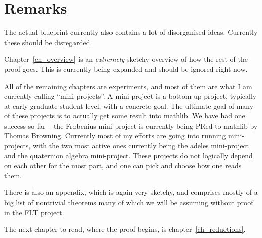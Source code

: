 \section{Remarks}

The actual blueprint currently also contains a lot of disorganised ideas. Currently these
should be disregarded.

Chapter~\ref{ch_overview} is an \emph{extremely} sketchy overview of how
the rest of the proof goes. This is currently being expanded and should be ignored
right now.

All of the remaining chapters are experiments, and most of them are what I am currently
calling ``mini-projects''. A mini-project is a bottom-up project, typically at early graduate
student level, with a concrete goal. The ultimate goal of many of these projects is to actually
get some result into mathlib. We have had one success so far -- the Frobenius mini-project
is currently being PRed to mathlib by Thomas Browning. Currently most of my efforts are
going into running mini-projects, with the two most active ones currently being the adeles
mini-project and the quaternion algebra mini-project. These projects do not logically depend
on each other for the most part, and one can pick and choose how one reads them.

There is also an appendix, which is again very sketchy, and comprises mostly of a big
list of nontrivial theorems many of which we will be assuming without proof in the FLT
project.

The next chapter to read, where the proof begins, is chapter~\ref{ch_reductions}.
